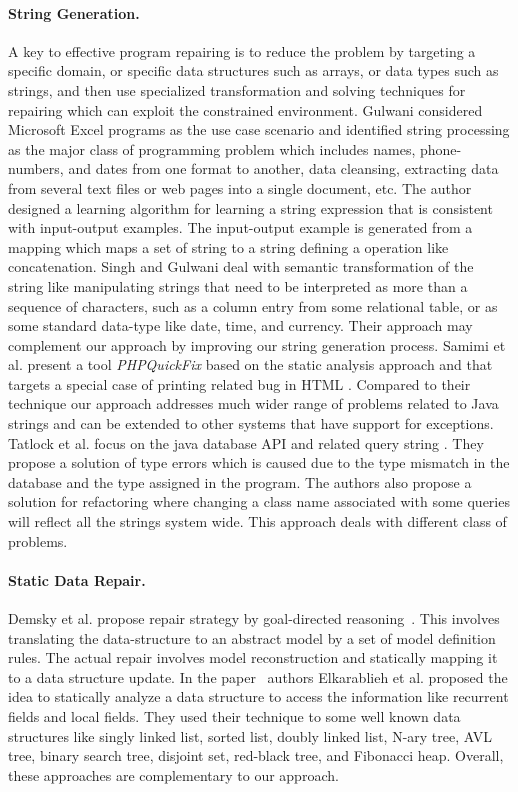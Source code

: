 \paragraph{String Generation.}
A key to effective program repairing is to reduce the problem by 
targeting a specific domain, or specific data structures such as arrays, or data types such as strings, and then use
specialized transformation and solving techniques for repairing which can exploit the constrained environment.
Gulwani \cite{Gulwani:2011} considered Microsoft Excel programs as the use case scenario and
identified string processing as the major class of programming problem which
includes names, phone-numbers, and dates from one format to another, data cleansing,
extracting data from several text files or web pages into a single document,
etc. The author designed a learning algorithm for learning a string expression
that is consistent with input-output examples. The input-output example is
generated from a mapping which maps a set of string to a string defining a
operation like concatenation.
Singh and Gulwani \cite{Singh:2012} deal with semantic transformation of the string
like manipulating strings that need to be interpreted as more than a sequence of
characters, such as a column entry from some relational table, or as some
standard data-type like date, time, and currency. Their approach may complement our approach by
improving our string generation process.
Samimi et al. present a tool \textit{PHPQuickFix} based on the static analysis approach and that
targets a special case of printing related bug in HTML \cite{SamirniSAMTH12}. Compared to their technique our
approach addresses much wider range of problems related to Java strings and can be extended to
other systems that have support for exceptions.
Tatlock et al. focus on the java database API and related query string \cite{Tatlock:2008}. They
propose a solution of type errors which is caused due to the type mismatch in
the database and the type assigned in the program. The authors also propose a
solution for refactoring where changing a class name associated with some
queries will reflect all the strings system wide. This approach deals with different class of problems.

\paragraph{Static Data Repair.}
Demsky et al. propose repair strategy by goal-directed reasoning~\cite{conf/icse/DemskyR05}. This involves
translating the data-structure to an abstract model by a set of model definition
rules. The actual repair involves model reconstruction and statically mapping it
to a data structure update. In the paper~\cite{conf/oopsla/2007} authors
Elkarablieh et al. proposed the idea to statically analyze a data structure to
access the information like recurrent fields and local fields. They used their
technique to some well known data structures like singly linked list, sorted
list, doubly linked list, N-ary tree, AVL tree, binary search tree, disjoint set,
red-black tree, and Fibonacci heap. Overall, these approaches are complementary to
our approach. 

